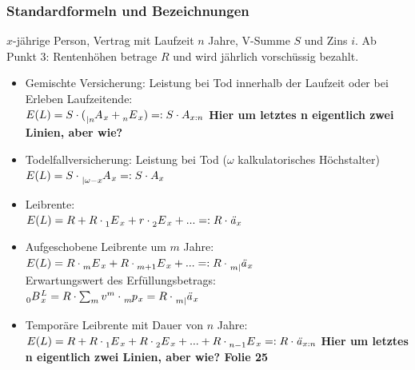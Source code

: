 \documentclass[12pt]{report}
\theoremstyle{dotless}
\theoremstyle{definition}
\begin{document}
\subsubsection{Standardformeln und Bezeichnungen}
$x$-jährige Person, Vertrag mit Laufzeit $n$ Jahre, V-Summe $S$ und Zins $i$. Ab Punkt 3: Rentenhöhen betrage $R$ und wird jährlich vorschüssig bezahlt.
\begin{itemize}
\item Gemischte Versicherung: Leistung bei Tod innerhalb der Laufzeit oder bei Erleben Laufzeitende: \\
$E(L) = S\cdot (\tensor[_{|n}]{A}{}_x + \tensor[_n]{E}{}_x) =: S\cdot A_{x:n}$
\textbf{Hier um letztes n eigentlich zwei Linien, aber wie?}
\item Todelfallversicherung: Leistung bei Tod ($\omega$ kalkulatorisches Höchstalter) \\
$E(L) = S \cdot \tensor[_{|\omega -x}]{A}{}_x =: S\cdot A_x$
\item Leibrente:\\
$E(L) = R + R \cdot \tensor[_1]{E}{}_x + r \cdot \tensor[_2]{E}{}_x + ... =: R \cdot \text{\textit{ä}}_x$
\item Aufgeschobene Leibrente um $m$ Jahre:\\
$E(L)= R \cdot \tensor[_m]{E}{}_x + R \cdot \tensor[_{m+1}]{E}{}_x + ... =: R \cdot \tensor[_{m|}]{\text{\textit{ä}}}{}_x$ \\
Erwartungswert des Erfüllungsbetrags: \\
$\tensor[_0]{B}{}_x^L = R \cdot \sum_m v^m \cdot \tensor[_m]{p}{}_x = R \cdot \tensor[_{m|}]{\text{\textit{ä}}}{}_x$
\item Temporäre Leibrente mit Dauer von $n$ Jahre: \\
$E(L) = R + R \cdot \tensor[_1]{E}{}_x + R \cdot \tensor[_2]{E}{}_x + ... + R \cdot \tensor[_{n-1}]{E}{}_x =: R \cdot \text{\textit{ä}}_{x:n} $ \textbf{Hier um letztes n eigentlich zwei Linien, aber wie? Folie 25}
\end{itemize}
\end{document}
